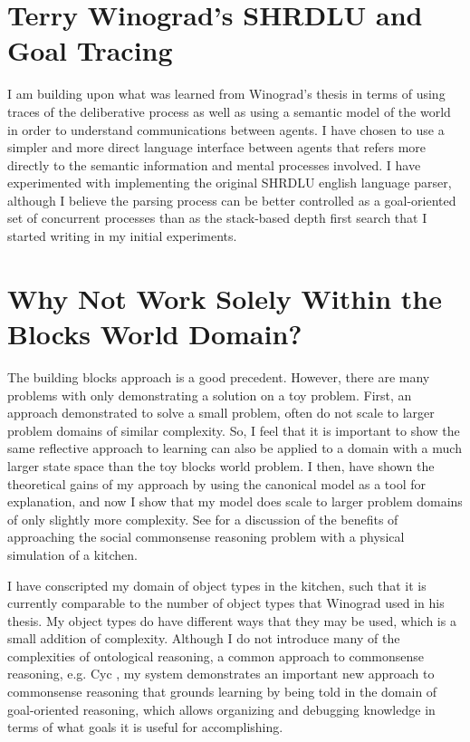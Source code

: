 \section{Terry Winograd's SHRDLU and Goal Tracing}

I am building upon what was learned from Winograd's thesis
\citep{winograd:1970} in terms of using traces of the deliberative
process as well as using a semantic model of the world in order to
understand communications between agents.  I have chosen to use a
simpler and more direct language interface between agents that refers
more directly to the semantic information and mental processes
involved.  I have experimented with implementing the original SHRDLU
english language parser, although I believe the parsing process can be
better controlled as a goal-oriented set of concurrent processes than
as the stack-based depth first search that I started writing in my
initial experiments.

\section{Why Not Work Solely Within the Blocks World Domain?}

The building blocks approach is a good precedent.  However, there are
many problems with only demonstrating a solution on a toy problem.
First, an approach demonstrated to solve a small problem, often do not
scale to larger problem domains of similar complexity.  So, I feel
that it is important to show the same reflective approach to learning
can also be applied to a domain with a much larger state space than
the toy blocks world problem.  I then, have shown the theoretical
gains of my approach by using the canonical model as a tool for
explanation, and now I show that my model does scale to larger
problem domains of only slightly more complexity.  See
\cite{smith:2010} for a discussion of the benefits of approaching the
social commonsense reasoning problem with a physical simulation of a
kitchen.

I have conscripted my domain of object types in the kitchen, such
that it is currently comparable to the number of object types that
Winograd used in his thesis.  My object types do have different ways
that they may be used, which is a small addition of complexity.
Although I do not introduce many of the complexities of ontological
reasoning, a common approach to commonsense reasoning, e.g. Cyc
\citep{lenat:1990}, my system demonstrates an important new approach
to commonsense reasoning that grounds learning by being told in the
domain of goal-oriented reasoning, which allows organizing and
debugging knowledge in terms of what goals it is useful for
accomplishing.

